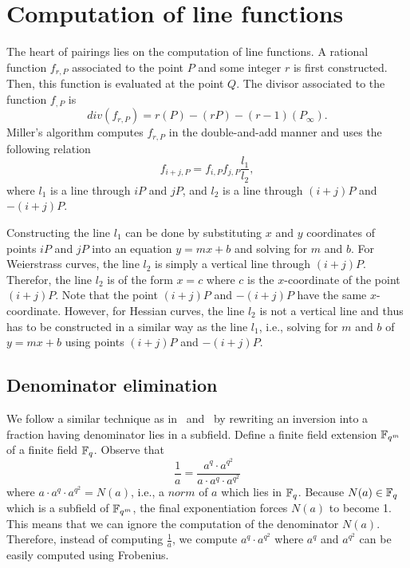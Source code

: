 \section{Computation of line functions}

The heart of pairings lies on the computation of line functions.
A rational function $f_{r,P}$ associated to the point $P$ and some integer $r$
is first constructed.
Then, this function is evaluated at the point $Q$.
The divisor associated to the function $f_{,P}$ is
$$ div(f_{r,P}) = r(P) - (rP) - (r-1)(P_\infty). $$
Miller's algorithm computes $f_{r,P}$ in the double-and-add manner
and uses the following relation
$$ f_{i+j,P} = f_{i,P} f_{j,P} \frac{l_1}{l_2}, $$
where $l_1$ is a line through $iP$ and $jP$,
and $l_2$ is a line through $(i+j)P$ and $-(i+j)P$.

Constructing the line $l_1$ can be done by substituting $x$ and $y$ coordinates of points $iP$ and $jP$
into an equation $y = mx + b$ and solving for $m$ and $b$.
For Weierstrass curves, the line $l_2$ is simply a vertical line through $(i+j)P$.
Therefor, the line $l_2$ is of the form $x = c$ where $c$ is the $x$-coordinate of the point $(i+j)P$.
Note that the point $(i+j)P$ and $-(i+j)P$ have the same $x$-coordinate.
However, for Hessian curves, the line $l_2$ is not a vertical line
and thus has to be constructed in a similar way as the line $l_1$,
i.e., solving for $m$ and $b$ of $y = mx + b$ using points $(i+j)P$ and $-(i+j)P$.



\subsection{Denominator elimination}
We follow a similar technique as in~\cite{2008/lin} and~\cite{2011/mrabet}
by rewriting an inversion into a fraction having denominator lies in a subfield.
Define a finite field extension $\mathbb{F}_{q^m}$ of a finite field $\mathbb{F}_{q}$.
%
Observe that
$$ \frac{1}{a} = \frac{a^q \cdot a^{q^2}} {a \cdot a^{q} \cdot a^{q^2}} $$
where $a \cdot a^{q} \cdot a^{q^2} = N(a)$, i.e., a $norm$ of $a$ which lies in $\mathbb{F}_{q}$.
Because $N(a) \in \mathbb{F}_{q}$ which is a subfield of $\mathbb{F}_{q^m}$,
the final exponentiation forces $N(a)$ to become 1.
This means that we can ignore the computation of the denominator $N(a)$.
Therefore, instead of computing $\frac{1}{a}$,
we compute $a^{q} \cdot a^{q^2}$ where
$a^{q}$ and $a^{q^2}$ can be easily computed using Frobenius.

